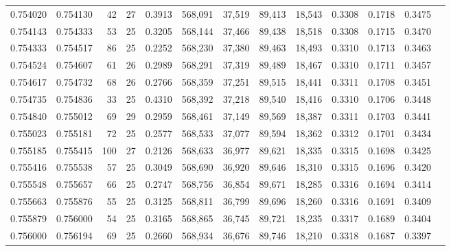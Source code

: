 \begin{tabular}{rrrrrrrrrrrrr}
0.754020 & 0.754130 &    42 &  27 &                                     0.3913 & 568,091 &  37,519 &  89,413 &  18,543 & 0.3308 & 0.1718 & 0.3475 \\
0.754143 & 0.754333 &    53 &  25 &                                     0.3205 & 568,144 &  37,466 &  89,438 &  18,518 & 0.3308 & 0.1715 & 0.3470 \\
0.754333 & 0.754517 &    86 &  25 &                                     0.2252 & 568,230 &  37,380 &  89,463 &  18,493 & 0.3310 & 0.1713 & 0.3463 \\
0.754524 & 0.754607 &    61 &  26 &                                     0.2989 & 568,291 &  37,319 &  89,489 &  18,467 & 0.3310 & 0.1711 & 0.3457 \\
0.754617 & 0.754732 &    68 &  26 &                                     0.2766 & 568,359 &  37,251 &  89,515 &  18,441 & 0.3311 & 0.1708 & 0.3451 \\
0.754735 & 0.754836 &    33 &  25 &                                     0.4310 & 568,392 &  37,218 &  89,540 &  18,416 & 0.3310 & 0.1706 & 0.3448 \\
0.754840 & 0.755012 &    69 &  29 &                                     0.2959 & 568,461 &  37,149 &  89,569 &  18,387 & 0.3311 & 0.1703 & 0.3441 \\
0.755023 & 0.755181 &    72 &  25 &                                     0.2577 & 568,533 &  37,077 &  89,594 &  18,362 & 0.3312 & 0.1701 & 0.3434 \\
0.755185 & 0.755415 &   100 &  27 &                                     0.2126 & 568,633 &  36,977 &  89,621 &  18,335 & 0.3315 & 0.1698 & 0.3425 \\
0.755416 & 0.755538 &    57 &  25 &                                     0.3049 & 568,690 &  36,920 &  89,646 &  18,310 & 0.3315 & 0.1696 & 0.3420 \\
0.755548 & 0.755657 &    66 &  25 &                                     0.2747 & 568,756 &  36,854 &  89,671 &  18,285 & 0.3316 & 0.1694 & 0.3414 \\
0.755663 & 0.755876 &    55 &  25 &                                     0.3125 & 568,811 &  36,799 &  89,696 &  18,260 & 0.3316 & 0.1691 & 0.3409 \\
0.755879 & 0.756000 &    54 &  25 &                                     0.3165 & 568,865 &  36,745 &  89,721 &  18,235 & 0.3317 & 0.1689 & 0.3404 \\
0.756000 & 0.756194 &    69 &  25 &                                     0.2660 & 568,934 &  36,676 &  89,746 &  18,210 & 0.3318 & 0.1687 & 0.3397 \\

\end{tabular}
